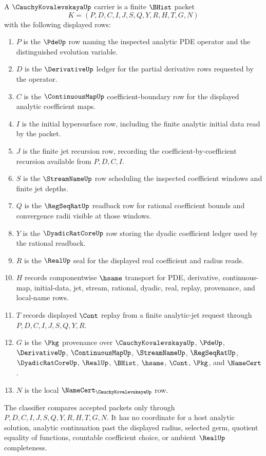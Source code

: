 \begin{definition}
\label{def:cauchy-kovalevskaya-carrier}
A $\CauchyKovalevskayaUp$ carrier is a finite $\BHist$ packet
$$
K=(P,D,C,I,J,S,Q,Y,R,H,T,G,N)
$$
with the following displayed rows:
\begin{enumerate}
\item $P$ is the $\PdeUp$ row naming the inspected analytic PDE operator and the distinguished evolution variable.
\item $D$ is the $\DerivativeUp$ ledger for the partial derivative rows requested by the operator.
\item $C$ is the $\ContinuousMapUp$ coefficient-boundary row for the displayed analytic coefficient maps.
\item $I$ is the initial hypersurface row, including the finite analytic initial data read by the packet.
\item $J$ is the finite jet recursion row, recording the coefficient-by-coefficient recursion available from $P,D,C,I$.
\item $S$ is the $\StreamNameUp$ row scheduling the inspected coefficient windows and finite jet depths.
\item $Q$ is the $\RegSeqRatUp$ readback row for rational coefficient bounds and convergence radii visible at those windows.
\item $Y$ is the $\DyadicRatCoreUp$ row storing the dyadic coefficient ledger used by the rational readback.
\item $R$ is the $\RealUp$ seal for the displayed real coefficient and radius reads.
\item $H$ records componentwise $\hsame$ transport for PDE, derivative, continuous-map, initial-data, jet, stream, rational, dyadic, real, replay, provenance, and local-name rows.
\item $T$ records displayed $\Cont$ replay from a finite analytic-jet request through $P,D,C,I,J,S,Q,Y,R$.
\item $G$ is the $\Pkg$ provenance over $\CauchyKovalevskayaUp$, $\PdeUp$, $\DerivativeUp$, $\ContinuousMapUp$, $\StreamNameUp$, $\RegSeqRatUp$, $\DyadicRatCoreUp$, $\RealUp$, $\BHist$, $\hsame$, $\Cont$, $\Pkg$, and $\NameCert$.
\item $N$ is the local $\NameCert_{\CauchyKovalevskayaUp}$ row.
\end{enumerate}
The classifier compares accepted packets only through $P,D,C,I,J,S,Q,Y,R,H,T,G,N$. It has no coordinate for a host analytic solution, analytic continuation past the displayed radius, selected germ, quotient equality of functions, countable coefficient choice, or ambient $\RealUp$ completeness.
\end{definition}

